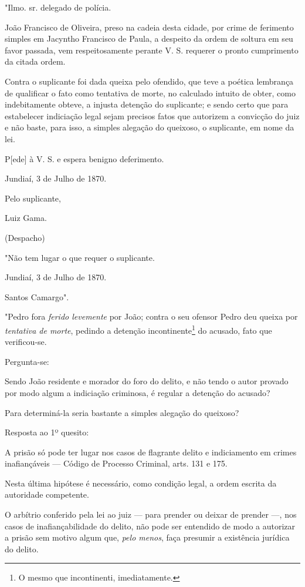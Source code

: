 \asterisc

"Ilmo. sr. delegado de polícia.

João Francisco de Oliveira, preso na cadeia desta cidade, por crime de
ferimento simples em Jacyntho Francisco de Paula, a despeito da ordem de
soltura em seu favor passada, vem respeitosamente perante V. S. requerer
o pronto cumprimento da citada ordem.

Contra o suplicante foi dada queixa pelo ofendido, que teve a poética
lembrança de qualificar o fato como tentativa de morte, no calculado
intuito de obter, como indebitamente obteve, a injusta detenção do
suplicante; e sendo certo que para estabelecer indiciação legal sejam
precisos fatos que autorizem a convicção do juiz e não baste, para isso,
a simples alegação do queixoso, o suplicante, em nome da lei.

P{[}ede{]} à V. S. e espera benigno deferimento.

Jundiaí, 3 de Julho de 1870.

Pelo suplicante,

Luiz Gama.

(Despacho)

"Não tem lugar o que requer o suplicante.

Jundiaí, 3 de Julho de 1870.

Santos Camargo".

\asterisc

"Pedro fora \emph{ferido levemente} por João; contra o seu ofensor Pedro
deu queixa por \emph{tentativa de morte}, pedindo a detenção
incontinente\footnote{O mesmo que incontinenti, imediatamente.} do
acusado, fato que verificou-se.

Pergunta-se:

Sendo João residente e morador do foro do delito, e não tendo o autor
provado por modo algum a indiciação criminosa, é regular a detenção do
acusado?

Para determiná-la seria bastante a simples alegação do queixoso?

Resposta ao 1º quesito:

A prisão só pode ter lugar nos casos de flagrante delito e indiciamento
em crimes inafiançáveis --- Código de Processo Criminal, arts. 131 e
175.

Nesta última hipótese é necessário, como condição legal, a ordem escrita
da autoridade competente.

O arbítrio conferido pela lei ao juiz --- para prender ou deixar de
prender ---, nos casos de inafiançabilidade do delito, não pode ser
entendido de modo a autorizar a prisão sem motivo algum que, \emph{pelo
menos}, faça presumir a existência jurídica do delito.

